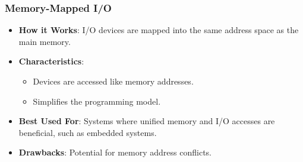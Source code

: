 \begin{frame}
    \frametitle{Memory-Mapped I/O}
    \begin{itemize}
        \item \textbf{How it Works}: I/O devices are mapped into the same address space as the main memory.
        \item \textbf{Characteristics}:
            \begin{itemize}
                \item Devices are accessed like memory addresses.
                \item Simplifies the programming model.
            \end{itemize}
        \item \textbf{Best Used For}: Systems where unified memory and I/O accesses are beneficial, such as embedded systems.
        \item \textbf{Drawbacks}: Potential for memory address conflicts.
    \end{itemize}
\end{frame}

